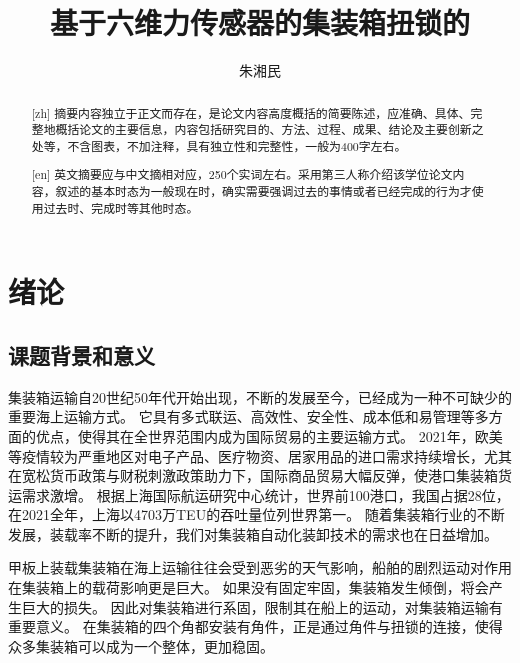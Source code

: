 \documentclass{seuthesis-2022}
\title{基于六维力传感器的集装箱扭锁的}{机器人智能开合操作}
\author{朱湘民}
\numberwithin{equation}{section}
\begin{document}
\maketitle
\makedeclaration

\frontmatter
\begin{abstract}[zh]
  摘要内容独立于正文而存在，是论文内容高度概括的简要陈述，应准确、具体、完整地概括论文的主要信息，内容包括研究目的、方法、过程、成果、结论及主要创新之处等，不含图表，不加注释，具有独立性和完整性，一般为400字左右。

\end{abstract}

\begin{abstract}[en]
  英文摘要应与中文摘相对应，250个实词左右。采用第三人称介绍该学位论文内容，叙述的基本时态为一般现在时，确实需要强调过去的事情或者已经完成的行为才使用过去时、完成时等其他时态。

\end{abstract}

\tableofcontents

\mainmatter
\chapter{绪论}
\section{课题背景和意义}
集装箱运输自20世纪50年代\cite{levinson2016box}开始出现，不断的发展至今，已经成为一种不可缺少的重要海上运输方式。
它具有多式联运、高效性、安全性、成本低和易管理等多方面的优点，使得其在全世界范围内成为国际贸易的主要运输方式。
2021年，欧美等疫情较为严重地区对电子产品、医疗物资、居家用品的进口需求持续增长，尤其在宽松货币政策与财税刺激政策助力下，国际商品贸易大幅反弹，使港口集装箱货运需求激增。
根据上海国际航运研究中心统计\cite{shanghai2022report}，世界前100港口，我国占据28位，在2021全年，上海以4703万TEU的吞吐量位列世界第一。
随着集装箱行业的不断发展，装载率不断的提升，我们对集装箱自动化装卸技术的需求也在日益增加。

甲板上装载集装箱在海上运输往往会受到恶劣的天气影响，船舶的剧烈运动对作用在集装箱上的载荷影响更是巨大。
如果没有固定牢固，集装箱发生倾倒，将会产生巨大的损失。
因此对集装箱进行系固，限制其在船上的运动，对集装箱运输有重要意义。
在集装箱的四个角都安装有角件，正是通过角件与扭锁的连接，使得众多集装箱可以成为一个整体，更加稳固\cite{谢琛2015集装箱扭锁技术的现状及发展趋势}。
\end{document}
